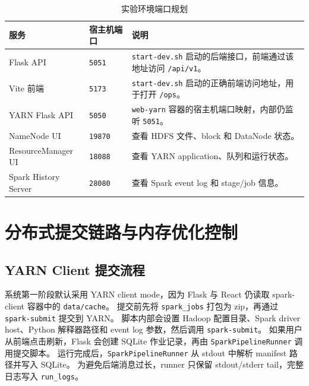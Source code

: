 \begin{table}[htbp]
    \centering
    \caption{实验环境端口规划}
    \label{tab:ports}
    \begin{tabularx}{0.92\textwidth}{l l X}
        \toprule
        \textbf{服务}          & \textbf{宿主机端口} & \textbf{说明}                                               \\
        \midrule
        Flask API            & \texttt{5051}  & \texttt{start-dev.sh} 启动的后端接口，前端通过该地址访问 \texttt{/api/v1}。 \\
        Vite 前端              & \texttt{5173}  & \texttt{start-dev.sh} 启动的正确前端访问地址，用于打开 \texttt{/ops}。     \\
        YARN Flask API       & \texttt{5050}  & \texttt{web-yarn} 容器的宿主机端口映射，内部仍监听 \texttt{5051}。         \\
        NameNode UI          & \texttt{19870} & 查看 HDFS 文件、block 和 DataNode 状态。                           \\
        ResourceManager UI   & \texttt{18088} & 查看 YARN application、队列和运行状态。                              \\
        Spark History Server & \texttt{28080} & 查看 Spark event log 和 stage/job 信息。                        \\
        \bottomrule
    \end{tabularx}
\end{table}

\section{分布式提交链路与内存优化控制}

\subsection{YARN Client 提交流程}

{\sloppy
    系统第一阶段默认采用 YARN client mode，因为 Flask 与 React 仍读取 spark-client 容器中的 \texttt{data/cache}。
    提交前先将 \texttt{spark\_jobs} 打包为 zip，再通过 \texttt{spark-submit} 提交到 YARN。
    脚本内部会设置 Hadoop 配置目录、Spark driver host、Python 解释器路径和 event log 参数，然后调用 \texttt{spark-submit}。
    如果用户从前端点击刷新，Flask 会创建 SQLite 作业记录，再由 \texttt{SparkPipelineRunner} 调用提交脚本。
    运行完成后，\texttt{SparkPipelineRunner} 从 stdout 中解析 manifest 路径并写入 SQLite。
    为避免后端消息过长，runner 只保留 stdout/stderr tail，完整日志写入 \texttt{run\_logs}。
    \par}

